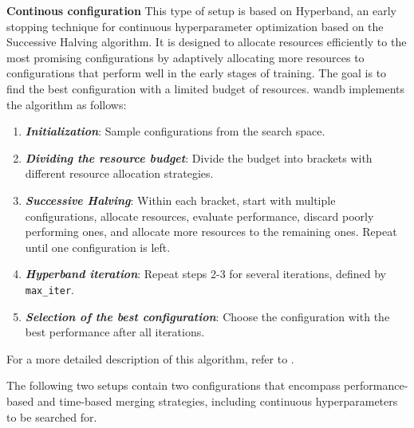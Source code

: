 \textbf{Continous configuration}\newline
This type of setup is based on Hyperband, an early stopping technique for continuous hyperparameter optimization based on the Successive Halving algorithm. It is designed to allocate resources efficiently to the most promising configurations by adaptively allocating more resources to configurations that perform well in the early stages of training. The goal is to find the best configuration with a limited budget of resources. \acf{wandb} implements the algorithm as follows:
\begin{enumerate}
  \item \textbf{\emph{Initialization}}: Sample configurations from the search space.
  \item \textbf{\emph{Dividing the resource budget}}: Divide the budget into brackets with different resource allocation strategies.
  \item \textbf{\emph{Successive Halving}}: Within each bracket, start with multiple configurations, allocate resources, evaluate performance, discard poorly performing ones, and allocate more resources to the remaining ones. Repeat until one configuration is left.
  \item \textbf{\emph{Hyperband iteration}}: Repeat steps 2-3 for several iterations, defined by \texttt{max\_iter}.
  \item \textbf{\emph{Selection of the best configuration}}: Choose the configuration with the best performance after all iterations.
\end{enumerate}
For a more detailed description of this algorithm, refer to \cite{DBLP:journals/corr/LiJDRT16}.

The following two setups contain two configurations that encompass performance-based and time-based merging strategies, including continuous hyperparameters to be searched for.

